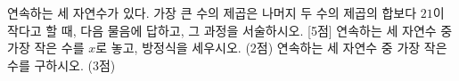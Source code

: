 연속하는 세 자연수가 있다. 가장 큰 수의 제곱은 나머지 두 수의 제곱의 합보다 $21$이 작다고 할 때, 다음 물음에 답하고, 그 과정을 서술하시오. \mbox{[5점]}
 연속하는 세 자연수 중 가장 작은 수를 $x$로 놓고, 방정식을 세우시오. (2점)
 연속하는 세 자연수 중 가장 작은 수를 구하시오. (3점)
